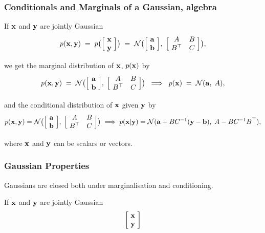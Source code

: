 \begin{frame}
\frametitle{Conditionals and Marginals of a Gaussian, algebra}

If ${\bf x}$ and ${\bf y}$ are jointly Gaussian
\[
p(\mathbf x,\mathbf y)\;=\;p\big(\Big[\!\begin{array}{c}\mathbf x\\ \mathbf y\end{array}
\!\Big]\big)\;=\;{\cal N}\big(\Big[\!\begin{array}{c}{\bf a} \\ {\bf b}\end{array}\!\Big],
\;\Big[\!\begin{array}{cc}A & B \\ B^\top & C\end{array}\!\Big]\big),
\]

we get the marginal distribution of ${\bf x}$, $p(\mathbf x)$ by
\[
p(\mathbf x,\mathbf y)\;=\;{\cal N}\big(\Big[\!\begin{array}{c}{\bf a} \\ {\bf b}
\end{array}\!\Big],
\;\Big[\!\begin{array}{cc}A & B \\ B^\top & C\end{array}\!\Big]\big)
\;\;\Longrightarrow\;\;p(\mathbf x)\;=\;{\cal N}({\bf a},\;A),
\]

and the conditional distribution of ${\bf x}$ given ${\bf y}$ by
\[
p(\mathbf x,\mathbf y)={\cal N}\big(\Big[\!\begin{array}{c}{\bf a} \\ {\bf b}
\end{array}\!\Big],
\;\Big[\!\begin{array}{cc}A & B \\ B^\top & C\end{array}\!\Big]\big)
\;\Longrightarrow\;p(\mathbf x|\mathbf y)={\cal N}({\bf a}+BC^{-1}(\mathbf y-\mathbf b),\;
A-BC^{-1}B^\top),
\]

where ${\bf x}$ and ${\bf y}$ can be scalars or vectors.
\end{frame}



\begin{frame}
\frametitle{Gaussian Properties}

Gaussians are closed both under marginalisation and conditioning.

If ${\bf x}$ and ${\bf y}$ are jointly Gaussian
\[
\left[\!\begin{array}{c}{\bf x}\\{\bf y}\end{array}\!\right] 
\]

\end{frame}

